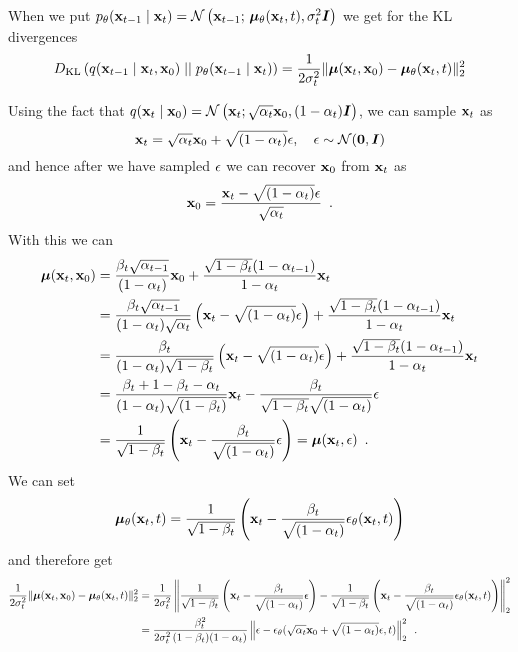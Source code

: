 When we put $p_{\theta}({\mathbf{x}}_{t-1} \mid {\mathbf{x}}_{t}) = \mathcal{N} \left({\mathbf{x}}_{t-1};\, {\bm{\mu}}_{\theta}({\mathbf{x}}_t,t), \sigma_t^2 {\bm{I}} \right)$ we get for the KL divergences
\begin{equation}
    D_{\mathrm{KL}}\left( q({\mathbf{x}}_{t-1} \mid {\mathbf{x}}_{t}, {\mathbf{x}}_0) \mid\mid p_{\theta}({\mathbf{x}}_{t-1} \mid {\mathbf{x}}_{t}) \right) 
    = \frac{1}{2 \sigma_t^2} \lVert {\bm{\mu}}({\mathbf{x}}_t, {\mathbf{x}}_0) -  {\bm{\mu}}_{\theta}({\mathbf{x}}_t,t)\rVert_{2}^{2}
\end{equation}

Using the fact that $q({\mathbf{x}}_t \mid {\mathbf{x}}_0)
= \mathcal{N} \left( {\mathbf{x}}_t;
\sqrt{\alpha_t} {\mathbf{x}}_0,
(1 - \alpha_t) {\bm{I}}
\right)
$, we can sample ${\mathbf{x}}_t$ as
\begin{equation}
    {\mathbf{x}}_t = \sqrt{\alpha_t} {\mathbf{x}}_0 + \sqrt{(1 - \alpha_t)} {\mathbf{\epsilon}}, \quad {\mathbf{\epsilon}} \sim \mathcal{N}({\bm{0}}, {\bm{I}})
\end{equation}
and hence after we have sampled ${\mathbf{\epsilon}}$ we can recover ${\mathbf{x}}_0$ from ${\mathbf{x}}_t$ as
\begin{equation}
    {\mathbf{x}}_0 = \frac{{\mathbf{x}}_t - \sqrt{(1 - \alpha_t)} {\mathbf{\epsilon}}}{\sqrt{\alpha_t}} \enspace .
\end{equation}
With this we can 
\begin{align}
    {\bm{\mu}}({\mathbf{x}}_t, {\mathbf{x}}_0) & = \frac{\beta_t\sqrt{\alpha_{t-1}}}{(1 - \alpha_t)} {\mathbf{x}}_0
    + \frac{\sqrt{1-\beta_t}(1 - \alpha_{t-1})}{1 - \alpha_t}{\mathbf{x}}_t \nonumber \\
    & = \frac{\beta_t\sqrt{\alpha_{t-1}}}{(1 - \alpha_t)\sqrt{\alpha_t}} 
    \left({\mathbf{x}}_t - \sqrt{(1 - \alpha_t)} {\mathbf{\epsilon}} \right)
    + \frac{\sqrt{1-\beta_t}(1 - \alpha_{t-1})}{1 - \alpha_t}{\mathbf{x}}_t \nonumber \\
    & = \frac{\beta_t}{(1 - \alpha_t)\sqrt{1 - \beta_t}} \left({\mathbf{x}}_t - \sqrt{(1 - \alpha_t)} {\mathbf{\epsilon}} \right)
    + \frac{\sqrt{1-\beta_t}(1 - \alpha_{t-1})}{1 - \alpha_t}{\mathbf{x}}_t \nonumber \\
    & = \frac{\beta_t + 1-\beta_t - \alpha_{t}}{(1 - \alpha_t)\sqrt{(1 - \beta_t)}} {\mathbf{x}}_t
    - \frac{\beta_t}{\sqrt{1 - \beta_t}\sqrt{(1 - \alpha_t)}} {\mathbf{\epsilon}} \nonumber \\
    & = \frac{1}{\sqrt{1 - \beta_t}} \left({\mathbf{x}}_t - \frac{\beta_t}{\sqrt{(1 - \alpha_t)}} {\mathbf{\epsilon}} \right)
    = {\bm{\mu}}({\mathbf{x}}_t, {\mathbf{\epsilon}}) \enspace .
\end{align}
We can set 
\begin{equation}
    {\bm{\mu}}_{\theta}({\mathbf{x}}_t,t) = \frac{1}{\sqrt{1 - \beta_t}} \left({\mathbf{x}}_t - \frac{\beta_t}{\sqrt{(1 - \alpha_t)}} {\mathbf{\epsilon}}_\theta({\mathbf{x}}_t, t) \right)
\end{equation}
and therefore get
\begin{align}
    \frac{1}{2 \sigma_t^2} \lVert {\bm{\mu}}({\mathbf{x}}_t, {\mathbf{x}}_0) -  {\bm{\mu}}_{\theta}({\mathbf{x}}_t,t)\rVert_{2}^{2} 
    & =  \frac{1}{2 \sigma_t^2} \left\lVert 
        \frac{1}{\sqrt{1 - \beta_t}} \left({\mathbf{x}}_t - \frac{\beta_t}{\sqrt{(1 - \alpha_t)}} {\mathbf{\epsilon}} \right)
    -  \frac{1}{\sqrt{1 - \beta_t}} \left({\mathbf{x}}_t - \frac{\beta_t}{\sqrt{(1 - \alpha_t)}} {\mathbf{\epsilon}}_\theta({\mathbf{x}}_t, t) \right) \right\rVert_{2}^{2} \nonumber \\
    & = \frac{\beta_t^2}{2 \sigma_t^2 \, (1-\beta_t) (1-\alpha_t)}
    \left\lVert 
        {\mathbf{\epsilon}} - {\mathbf{\epsilon}}_{\theta}(\sqrt{\alpha_t} {\mathbf{x}}_0 + \sqrt{(1 - \alpha_t)} {\mathbf{\epsilon}}, t)
    \right\rVert_{2}^{2} \enspace .
\end{align}

